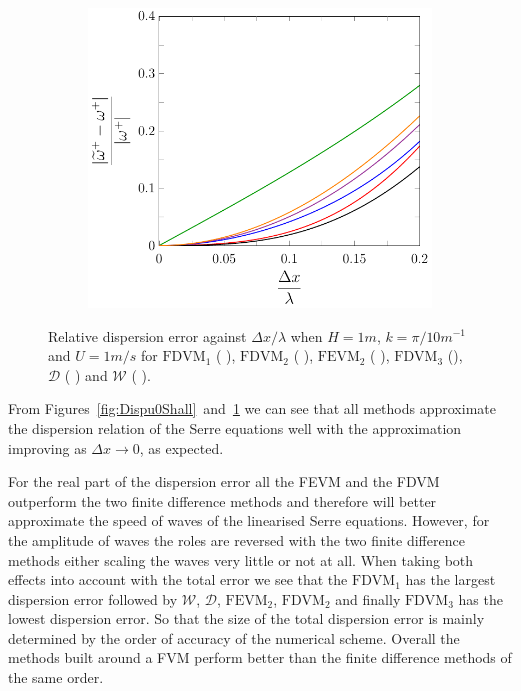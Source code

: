 \begin{figure}
\begin{subfigure}{0.5\textwidth}
	\end{subfigure}
	\par\bigskip
	\begin{subfigure}{0.5\textwidth}
		\includegraphics[width=\textwidth]{./chp4/figures/New/Dispu1Shall.pdf}
	\end{subfigure}
	\caption{Relative dispersion error against $\Delta x / \lambda$ when $H = 1m$, $k = {\pi}/{10}m^{-1}$ and $U = 1 m/s$ for $\text{FDVM}_1$ ({\color{green!60!black} \solidrule}), $\text{FDVM}_2$ ({\color{red} \solidrule}), $\text{FEVM}_2$ ({\color{blue} \solidrule}), $\text{FDVM}_3$ ({\solidrule}), $\mathcal{D}$ ({\color{violet!80!white} \solidrule}) and $\mathcal{W}$ ({\color{orange} \solidrule}).}
	\label{fig:Dispu1Shall}
\end{figure}

From Figures~\ref{fig:Dispu0Shall}~and~\ref{fig:Dispu1Shall} we can see that all methods approximate the dispersion relation of the Serre equations well with the approximation improving as $\Delta x \rightarrow 0$, as expected.

For the real part of the dispersion error all the FEVM and the FDVM outperform the two finite difference methods and therefore will better approximate the speed of waves of the linearised Serre equations. However, for the amplitude of waves the roles are reversed with the two finite difference methods either scaling the waves very little or not at all. When taking both effects into account with the total error we see that the $\text{FDVM}_1$ has the largest dispersion error followed by $\mathcal{W}$, $\mathcal{D}$, $\text{FEVM}_2$, $\text{FDVM}_2$ and finally $\text{FDVM}_3$ has the lowest dispersion error. So that the size of the total dispersion error is mainly determined by the order of accuracy of the numerical scheme. Overall the methods built around a FVM perform better than the finite difference methods of the same order. 


